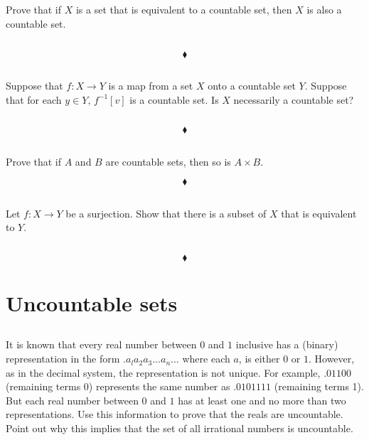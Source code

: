 \subsection{}
\begin{tcolorbox}
Prove that if $X$ is a set that is equivalent to a countable set, then $X$ is also a countable set. 

\end{tcolorbox}
$$ $$

$$\blacklozenge$$

\subsection{}
\begin{tcolorbox}
Suppose that $f: X\rightarrow Y$ is a map from a set $X$ onto a countable set $Y$. Suppose that for each $y \in  Y,\,  f^{-1}[v]$ is a countable set. Is $X$ necessarily a countable set? 

\end{tcolorbox}
$$ $$

$$\blacklozenge$$


\subsection{}
\begin{tcolorbox}
Prove that if $A$ and $B$ are countable sets, then so is $A \times B$.  
\end{tcolorbox}
$$ $$
$$\blacklozenge$$

\subsection{}
\begin{tcolorbox}
Let $f: X \rightarrow Y$ be a surjection. Show that there is a subset of $X$ that is equivalent to $Y$. 
\end{tcolorbox}
$$ $$

$$\blacklozenge$$


\newpage

 \section{Uncountable sets}
\subsection{}
\begin{tcolorbox}
It is known that every real number between $0$ and $1$ inclusive has a (binary) representation in the form $.a_l a_2 a_3 \dots a_n\dots$ where each $a$, is either $0$ or $1$. However, as in the decimal system, the representation is not unique. For example, $.01100$ (remaining terms 0) represents the same number as $.0101111$ (remaining terms 1). But each real number between $0$ and $1$ has at least one and no more than two representations. Use this information to prove that the reals are uncountable. Point out why this implies that the set of all irrational numbers is uncountable. 
\end{tcolorbox}
$$ $$

